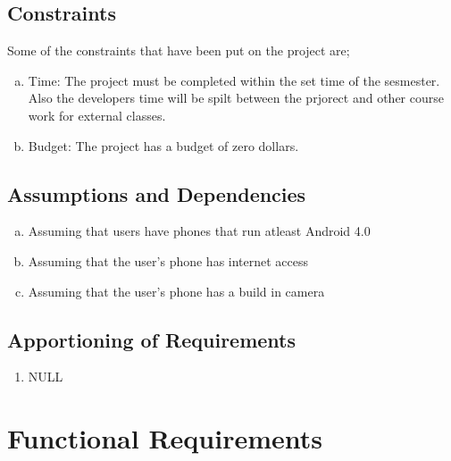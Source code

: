 \documentclass[]{article}
\begin{document}
\subsection{Constraints}

\label{sub:constraints}
Some of the constraints that have been put on the project are;
\begin{enumerate}[a)]
	\item Time: The project must be completed within the set time of the sesmester. Also the developers time will be spilt between the prjorect and other course work for external classes. 
	\item Budget: The project has a budget of zero dollars.  
\end{enumerate}

\subsection{Assumptions and Dependencies}
\label{sub:assumptions_and_dependencies}
\begin{enumerate}[a)]
	\item Assuming that users have phones that run atleast Android 4.0
	\item Assuming that the user's phone has internet access
	\item Assuming that the user's phone has a build in camera 
\end{enumerate}

\subsection{Apportioning of Requirements}
\label{sub:apportioning_of_requirements}
\begin{enumerate}
\item NULL 
\end{enumerate}

\section{Functional Requirements}
\label{sec:functional_requirements}
\end{document}
